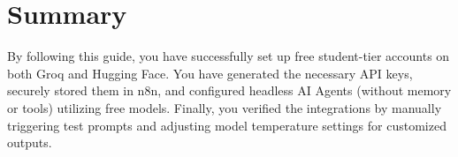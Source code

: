 \documentclass[12pt,a4paper]{article}
\begin{document}
\section{Summary}
By following this guide, you have successfully set up free student-tier accounts on both Groq and Hugging Face. You have generated the necessary API keys, securely stored them in n8n, and configured headless AI Agents (without memory or tools) utilizing free models. Finally, you verified the integrations by manually triggering test prompts and adjusting model temperature settings for customized outputs.
\end{document}
